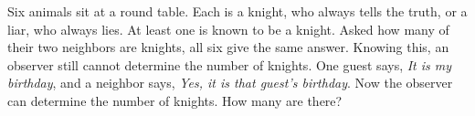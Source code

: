 Six animals sit at a round table. Each is a knight, who always tells the truth, or a liar, who always lies. At least one is known to be a knight. Asked how many of their two neighbors are knights, all six give the same answer. Knowing this, an observer still cannot determine the number of knights. One guest says, \emph{It is my birthday}, and a neighbor says, \emph{Yes, it is that guest's birthday}. Now the observer can determine the number of knights. How many are there?
